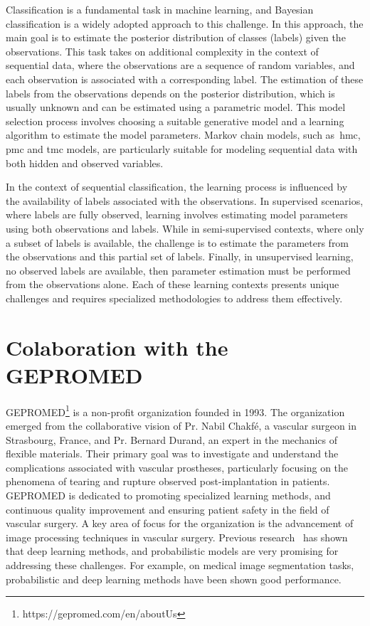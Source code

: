 Classification is a fundamental task in machine learning, and Bayesian
classification is a widely adopted approach to this challenge. In this approach,
the main goal is to estimate the posterior distribution of classes (labels)
given the observations. This task takes on additional complexity in the context
of sequential data, where the observations are a sequence of random variables,
and each observation is associated with a corresponding label. The estimation of
these labels from the observations depends on the posterior distribution, which
is usually unknown and can be estimated using a parametric model. This model
selection process involves choosing a suitable generative model and a learning
algorithm to estimate the model parameters. Markov chain models, such 
as~\gls*{hmc}, \gls*{pmc} and \gls*{tmc} models, 
are particularly suitable for modeling sequential data with both hidden
and observed variables. 

In the context of sequential classification, the learning process is influenced
by the availability of labels associated with the observations. 
In supervised scenarios, where labels
are fully observed, learning involves estimating model parameters using both
observations and labels. While in semi-supervised contexts, where only a subset of
labels is available, the challenge is to estimate the parameters from the
observations and this partial set of labels. Finally, in unsupervised learning,
no observed labels are available, then parameter estimation must be performed from
the observations alone.
Each of these learning contexts presents unique challenges and requires
specialized methodologies to address them effectively.



\section*{Colaboration with the GEPROMED}

GEPROMED\footnote{https://gepromed.com/en/aboutUs}
is a non-profit organization founded in 1993.
The organization emerged from the collaborative vision of Pr. Nabil Chakfé, a
vascular surgeon in Strasbourg, France, and Pr. Bernard Durand, an expert in the
mechanics of flexible materials. Their primary goal was to
investigate and understand the complications associated with vascular prostheses,
particularly focusing on the phenomena of tearing and rupture observed
post-implantation in patients.
GEPROMED is dedicated to promoting specialized learning methods, and
continuous quality improvement and ensuring patient safety in the field of
vascular surgery. A key area of focus for the organization is the advancement of
image processing techniques in vascular surgery. 
Previous research~\citep{gangloff2020probabilistic} has shown that deep 
learning methods, and probabilistic models
are very promising for addressing these challenges. 
For example, on medical image segmentation tasks,
probabilistic and deep learning methods have been shown 
good performance.


